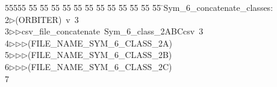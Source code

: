 %
%
\begin{tabbing}
55555 \= 55 \= 55 \= 55 \= 55 \= 55 \= 55 \= 55 \= 55 \= 55 \= 55 \= 55 \= 55 \= \>Sym\_6\_concatenate\_classes:\\[0pt]
2\>$\triangleright$\>(ORBITER)\ v\ 3\ \\[0pt]
3\>$\triangleright$\>$\triangleright$\>csv\_file\_concatenate\ Sym\_6\_class\_2ABCcsv\ 3\ \\[0pt]
4\>$\triangleright$\>$\triangleright$\>$\triangleright$\>(FILE\_NAME\_SYM\_6\_CLASS\_2A)\ \\[0pt]
5\>$\triangleright$\>$\triangleright$\>$\triangleright$\>(FILE\_NAME\_SYM\_6\_CLASS\_2B)\ \\[0pt]
6\>$\triangleright$\>$\triangleright$\>$\triangleright$\>(FILE\_NAME\_SYM\_6\_CLASS\_2C)\\[0pt]
7\>\end{tabbing}
